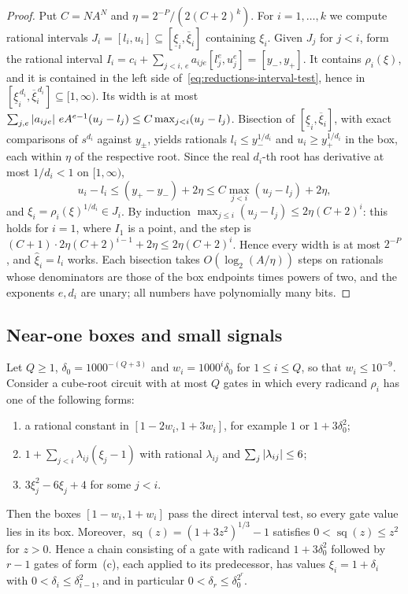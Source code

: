 \begin{proof}
Put $C=NA^N$ and $\eta=2^{-P}/(2(C+2)^k)$. For $i=1,\ldots,k$ we compute
rational intervals $J_i=[l_i,u_i]\subseteq[\underline\xi_i,\overline\xi_i]$
containing $\xi_i$. Given $J_j$ for $j<i$, form the rational interval
$I_i=c_i+\sum_{j<i,\,e}a_{ije}[l_j^e,u_j^e]=[y_-,y_+]$. It contains $\rho_i(\xi)$,
and it is contained in the left side of~\eqref{eq:reductions-interval-test}, hence
in $[\underline\xi_i^{\,d_i},\overline\xi_i^{\,d_i}]\subseteq[1,\infty)$. Its width
is at most $\sum_{j,e}\left\lvert a_{ije}\right\rvert\,eA^{e-1}(u_j-l_j)\le C\max_{j<i}(u_j-l_j)$.
Bisection of $[\underline\xi_i,\overline\xi_i]$, with exact comparisons of
$s^{d_i}$ against $y_\pm$, yields rationals $l_i\le y_-^{1/d_i}$ and
$u_i\ge y_+^{1/d_i}$ in the box, each within $\eta$ of the respective root. Since
the real $d_i$-th root has derivative at most $1/d_i<1$ on $[1,\infty)$,
\[
 u_i-l_i\le(y_+-y_-)+2\eta\le C\max_{j<i}(u_j-l_j)+2\eta,
\]
and $\xi_i=\rho_i(\xi)^{1/d_i}\in J_i$. By induction
$\max_{j\le i}(u_j-l_j)\le2\eta(C+2)^i$: this holds for $i=1$, where $I_1$ is a
point, and the step is
$(C+1)\cdot2\eta(C+2)^{i-1}+2\eta\le2\eta(C+2)^i$. Hence every width is at most
$2^{-P}$, and $\widehat\xi_i=l_i$ works. Each bisection takes
$O(\log_2(A/\eta))$ steps on rationals whose denominators are those of the box
endpoints times powers of two, and the exponents $e,d_i$ are unary; all
numbers have polynomially many bits.
\end{proof}

\subsection{Near-one boxes and small signals}
\label{app:reductions-small-signal}

\begin{lemma}
\label{lem:reductions-small-signal}
Let $Q\ge1$, $\delta_0=1000^{-(Q+3)}$ and $w_i=1000^i\delta_0$ for
$1\le i\le Q$, so that $w_i\le10^{-9}$. Consider a cube-root circuit with at most
$Q$ gates in which every radicand $\rho_i$ has one of the following forms:
\begin{enumerate}[label=(\alph*)]
\item a rational constant in $[1-2w_i,1+3w_i]$, for example $1$ or
$1+3\delta_0^2$;
\item $1+\sum_{j<i}\lambda_{ij}(\xi_j-1)$ with rational $\lambda_{ij}$ and
$\sum_j\left\lvert\lambda_{ij}\right\rvert\le6$;
\item $3\xi_j^2-6\xi_j+4$ for some $j<i$.
\end{enumerate}
Then the boxes $[1-w_i,1+w_i]$ pass the direct interval test, so every gate
value lies in its box. Moreover, $\operatorname{sq}(z)=(1+3z^2)^{1/3}-1$
satisfies $0<\operatorname{sq}(z)\le z^2$ for $z>0$. Hence a chain consisting of
a gate with radicand $1+3\delta_0^2$ followed by $r-1$ gates of form~(c), each
applied to its predecessor, has values $\xi_i=1+\delta_i$ with
$0<\delta_i\le\delta_{i-1}^2$, and in particular
$0<\delta_r\le\delta_0^{2^r}$.
\end{lemma}

